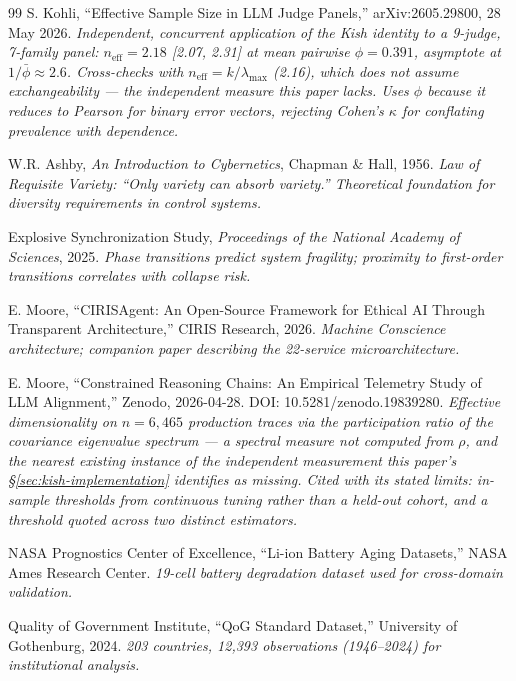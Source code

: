 \documentclass[11pt,a4paper]{article}
\theoremstyle{definition}
\theoremstyle{remark}
\begin{document}
\begin{thebibliography}{99}
S. Kohli, ``Effective Sample Size in LLM Judge Panels,'' arXiv:2605.29800, 28 May 2026.
\textit{Independent, concurrent application of the Kish identity to a 9-judge, 7-family panel: $n_{\text{eff}} = 2.18$ [2.07, 2.31] at mean pairwise $\phi = 0.391$, asymptote at $1/\bar{\phi} \approx 2.6$. Cross-checks with $n_{\text{eff}} = k/\lambda_{\max}$ (2.16), which does not assume exchangeability --- the independent measure this paper lacks. Uses $\phi$ because it reduces to Pearson for binary error vectors, rejecting Cohen's $\kappa$ for conflating prevalence with dependence.}

W.R. Ashby, \textit{An Introduction to Cybernetics}, Chapman \& Hall, 1956.
\textit{Law of Requisite Variety: ``Only variety can absorb variety.'' Theoretical foundation for diversity requirements in control systems.}

Explosive Synchronization Study, \textit{Proceedings of the National Academy of Sciences}, 2025.
\textit{Phase transitions predict system fragility; proximity to first-order transitions correlates with collapse risk.}

E. Moore, ``CIRISAgent: An Open-Source Framework for Ethical AI Through Transparent Architecture,'' CIRIS Research, 2026.
\textit{Machine Conscience architecture; companion paper describing the 22-service microarchitecture.}

E. Moore, ``Constrained Reasoning Chains: An Empirical Telemetry Study of LLM Alignment,'' Zenodo, 2026-04-28. DOI: 10.5281/zenodo.19839280.
\textit{Effective dimensionality on $n=6{,}465$ production traces via the participation ratio of the covariance eigenvalue spectrum --- a spectral measure not computed from $\rho$, and the nearest existing instance of the independent measurement this paper's \S\ref{sec:kish-implementation} identifies as missing. Cited with its stated limits: in-sample thresholds from continuous tuning rather than a held-out cohort, and a threshold quoted across two distinct estimators.}

NASA Prognostics Center of Excellence, ``Li-ion Battery Aging Datasets,'' NASA Ames Research Center.
\textit{19-cell battery degradation dataset used for cross-domain validation.}

Quality of Government Institute, ``QoG Standard Dataset,'' University of Gothenburg, 2024.
\textit{203 countries, 12,393 observations (1946--2024) for institutional analysis.}


\end{thebibliography}
\end{document}
